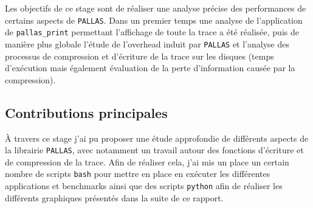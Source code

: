 Les objectifs de ce stage sont de réaliser une analyse précise des performances de certains aspects de \verb!PALLAS!. Dans un premier temps une analyse de l'application de \verb!pallas_print! permettant
l'affichage de toute la trace a été réalisée, puis de manière plus globale l'étude de l'overhead induit par \verb!PALLAS! et l'analyse des processus de compression et d'écriture de la trace sur les disques (temps d'exécution mais 
également évaluation de la perte d'information causée par la compression). 



\subsection{Contributions principales}\label{ssec:introduction_contributions}
À travers ce stage j'ai pu proposer une étude approfondie de différents aspects de la librairie \verb!PALLAS!, avec notamment un travail autour des fonctions d'écriture et de compression
de la trace.
Afin de réaliser cela, j'ai mis un place un certain nombre de scripts \verb!bash! pour mettre en place en exécuter les différentes applications et benchmarks ainsi que des 
scripts \verb!python! afin de réaliser les différents graphiques présentés dans la suite de ce rapport.
